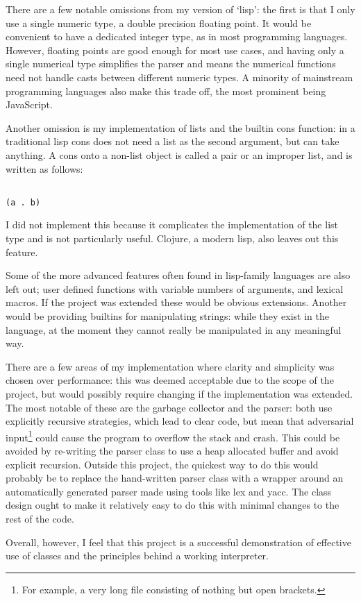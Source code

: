 \documentclass[12pt]{article}
\begin{document}
There are a few notable omissions from my version of `lisp': the first
is that I only use a single numeric type, a double precision floating
point. It would be convenient to have a dedicated integer type, as in
most programming languages. However, floating points are good enough
for most use cases, and having only a single numerical type simplifies
the parser and means the numerical functions need not handle casts
between different numeric types. A minority of mainstream programming
languages also make this trade off, the most prominent being
JavaScript.


Another omission is my implementation of lists and the builtin cons
function: in a traditional lisp cons does not need a list as the
second argument, but can take anything. A cons onto a non-list object
is called a pair or an improper list, and is written as follows:

\begin{lstlisting}

(a . b)

\end{lstlisting}

I did not implement this because it complicates the implementation of
the list type and is not particularly useful. Clojure, a modern lisp,
also leaves out this feature.


Some of the more advanced features often found in lisp-family
languages are also left out; user defined functions with variable
numbers of arguments, and lexical macros. If the project was extended
these would be obvious extensions. Another would be providing builtins
for manipulating strings: while they exist in the language, at the
moment they cannot really be manipulated in any meaningful way.


There are a few areas of my implementation where clarity and
simplicity was chosen over performance: this was deemed acceptable due
to the scope of the project, but would possibly require changing if
the implementation was extended. The most notable of these are the
garbage collector and the parser: both use explicitly recursive
strategies, which lead to clear code, but mean that adversarial input\footnote{
For example, a very long file consisting of nothing but open brackets.
}
could cause the program to overflow the stack and crash. This could 
be avoided by re-writing the parser class to use a heap allocated buffer
and avoid explicit recursion. Outside this project, the quickest way to
do this would probably be to replace the hand-written parser class with
a wrapper around an automatically generated parser made using tools like
lex and yacc. The class design ought to make it relatively easy to do this
with minimal changes to the rest of the code.

Overall, however, I feel that this project is a successful
demonstration of effective use of classes and the principles behind a
working interpreter.
\end{document}
